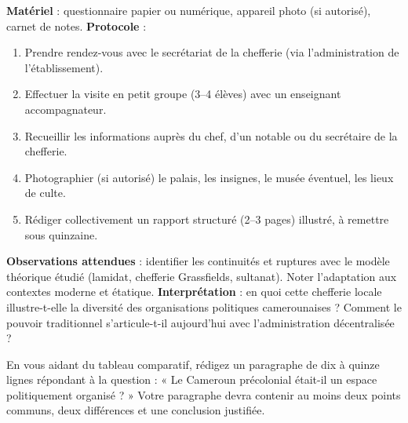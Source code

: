 \documentclass[11pt]{article}
\begin{document}
\begin{experience}
\textbf{Matériel} : questionnaire papier ou numérique, appareil photo (si autorisé), carnet de notes.
\textbf{Protocole} :
\begin{enumerate}
\item Prendre rendez-vous avec le secrétariat de la chefferie (via l'administration de l'établissement).
\item Effectuer la visite en petit groupe (3--4 élèves) avec un enseignant accompagnateur.
\item Recueillir les informations auprès du chef, d'un notable ou du secrétaire de la chefferie.
\item Photographier (si autorisé) le palais, les insignes, le musée éventuel, les lieux de culte.
\item Rédiger collectivement un rapport structuré (2--3 pages) illustré, à remettre sous quinzaine.
\end{enumerate}
\textbf{Observations attendues} : identifier les continuités et ruptures avec le modèle théorique étudié (lamidat, chefferie Grassfields, sultanat). Noter l'adaptation aux contextes moderne et étatique.
\textbf{Interprétation} : en quoi cette chefferie locale illustre-t-elle la diversité des organisations politiques camerounaises ? Comment le pouvoir traditionnel s'articule-t-il aujourd'hui avec l'administration décentralisée ?
\end{experience}

\begin{exercice}
En vous aidant du tableau comparatif, rédigez un paragraphe de dix à quinze lignes répondant à la question : « Le Cameroun précolonial était-il un espace politiquement organisé ? » Votre paragraphe devra contenir au moins deux points communs, deux différences et une conclusion justifiée.
\end{exercice}
\end{document}
